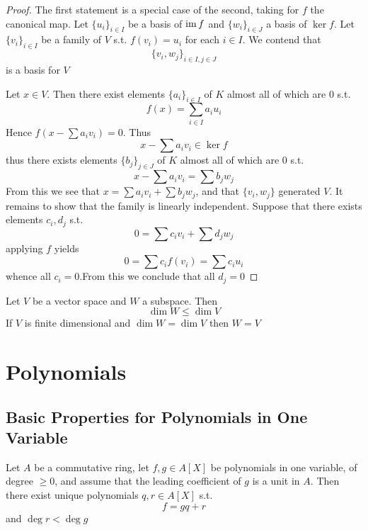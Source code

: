 \documentclass[11pt]{article}
\begin{document}
\begin{proof}
The first statement is a special case of the second, taking for \(f\) the canonical map.
Let \(\{u_i\}_{i\in I}\) be a basis of \(\operatorname{im} f\) and \(\{w_i\}_{i\in J}\) a basis of \(\ker f\).
Let \(\{v_i\}_{i\in I}\) be a family of \(V\) s.t. \(f(v_i)=u_i\) for each \(i\in I\). We contend that
\begin{equation*}
\{v_i,w_j\}_{i\in I,j\in J}
\end{equation*}
is a basis for \(V\)

Let \(x\in V\). Then there exist elements \(\{a_i\}_{i\in I}\) of \(K\) almost all of which are 0 s.t.
\begin{equation*}
f(x)=\sum_{i\in I}a_iu_i
\end{equation*}
Hence \(f(x-\sum a_iv_i)=0\). Thus
\begin{equation*}
x-\sum a_iv_i\in\ker f
\end{equation*}
thus there exists elements \(\{b_j\}_{j\in J}\) of \(K\) almost all of which are 0 s.t.
\begin{equation*}
x-\sum a_iv_i=\sum b_jw_j
\end{equation*}
From this we see that \(x=\sum a_iv_i+\sum b_jw_j\), and that \(\{v_i,w_j\}\) generated \(V\). It remains to
show that the family is linearly independent. Suppose that there exists elements \(c_i,d_j\) s.t.
\begin{equation*}
0=\sum c_iv_i+\sum d_jw_j
\end{equation*}
applying \(f\) yields
\begin{equation*}
0=\sum c_if(v_i)=\sum c_iu_i
\end{equation*}
whence all \(c_i=0\).From this we conclude that all \(d_j=0\)
\end{proof}

\begin{corollary}[]
Let \(V\) be a vector space and \(W\) a subspace. Then
\begin{equation*}
\dim W\le\dim V
\end{equation*}
If \(V\) is finite dimensional and \(\dim W=\dim V\) then \(W=V\)
\end{corollary}


\section{Polynomials}
\label{sec:org7b9ac8a}
\subsection{Basic Properties for Polynomials in One Variable}
\label{sec:orgd0c232e}
\begin{theorem}[]
Let \(A\) be a commutative ring, let \(f,g\in A[X]\)  be polynomials in one variable, of
degree \(\ge 0\), and assume that the leading coefficient of \(g\) is a unit in \(A\). Then there
exist unique polynomials \(q,r\in A[X]\) s.t.
\begin{equation*}
f=gq+r
\end{equation*}
and \(\deg r<\deg g\)
\end{theorem}
\end{document}
